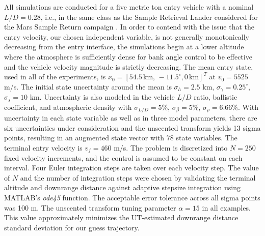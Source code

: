 \documentclass[journal ]{new-aiaa}
\begin{document}
All simulations are conducted for a five metric ton entry vehicle with a nominal $L/D=0.28$, i.e., in the same class as the Sample Retrieval Lander considered for the Mars Sample Return campaign \cite{MSR}. 
In order to contend with the issue that the entry velocity, our chosen independent variable, is not generally monotonically decreasing from the entry interface, 
the simulations begin at a lower altitude where the atmosphere is sufficiently dense for bank angle control to be effective and the vehicle velocity magnitude is strictly decreasing. The mean entry state, used in all of the experiments, is $x_0 = [54.5\,\mathrm{km},\,-11.5^{\circ}, 0\,\mathrm{km}]^T$ at $v_0 = 5525$ m/s. The initial state uncertainty around the mean is $\sigma_h = 2.5$ km, $\sigma_{\gamma} = 0.25^{\circ}$, $\sigma_s = 10$ km. Uncertainty is also modeled in the vehicle $L/D$ ratio, ballistic coefficient, and atmospheric density with $\sigma_{L/D} = 5\%$, $\sigma_{\beta} = 5\%$, $\sigma_{\rho} = 6.66\%$. With uncertainty in each state variable as well as in three model parameters, there are six uncertainties under consideration and the unscented transform yields 13 sigma points, resulting in an augmented state vector with 78 state variables. The terminal entry velocity is $v_f=460$ m/s. The problem is discretized into $N=250$ fixed velocity increments, and the control is assumed to be constant on each interval. Four Euler integration steps are taken over each velocity step. The value of $ N $ and the number of integration steps were chosen by validating the terminal altitude and downrange distance against adaptive stepsize integration using MATLAB's \textit{ode45} function. The acceptable error tolerance across all sigma points was 100 m. The unscented transform tuning parameter $\alpha=15$ in all examples. This value approximately minimizes the UT-estimated downrange distance standard deviation for our guess trajectory.  
\end{document}
